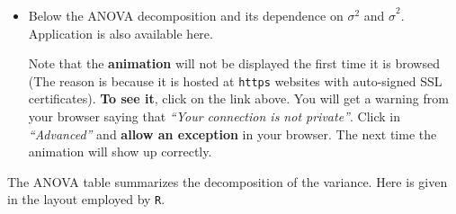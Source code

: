 \documentclass[]{book}
\newenvironment{rmdblock}[1]
  {\begin{shaded*}
  \begin{itemize}
  \renewcommand{\labelitemi}{
    \raisebox{-.7\height}[0pt][0pt]{
      {\setkeys{Gin}{width=2em,keepaspectratio}\texttt{[image: img/icons/\#1]}}
    }
  }
  \item
  }
  {
  \end{itemize}
  \end{shaded*}
  }
\newenvironment{rmdinsight}
  {\begin{rmdblock}{insight}}
  {\end{rmdblock}}
\theoremstyle{definition}
\theoremstyle{definition}
\theoremstyle{definition}
\theoremstyle{remark}
\begin{document}
\begin{rmdinsight}
Below the ANOVA decomposition and its dependence on \(\sigma^2\) and
\(\hat\sigma^2\). Application is also available here.

Note that the \textbf{animation} will not be displayed the first time it
is browsed (The reason is because it is hosted at \texttt{https}
websites with auto-signed SSL certificates). \textbf{To see it}, click
on the link above. You will get a warning from your browser saying that
\emph{``Your connection is not private''}. Click in \emph{``Advanced''}
and \textbf{allow an exception} in your browser. The next time the
animation will show up correctly.
\end{rmdinsight}

The ANOVA table summarizes the decomposition of the variance. Here is
given in the layout employed by \texttt{R}.
\end{document}
